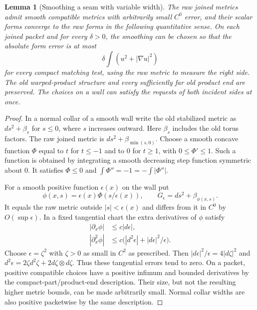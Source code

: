 \documentclass[11pt]{article}
\numberwithin{equation}{section}
\newtheorem{lemma}[theorem]{Lemma}
\theoremstyle{definition}
\theoremstyle{remark}
\begin{document}
\begin{lemma}[Smoothing a seam with variable width]\label{regular:seam}
The raw joined metrics admit smooth compatible metrics with arbitrarily
small $C^0$ error, and their scalar forms converge to the raw forms in
the following quantitative sense.  On each joined packet and for every
$\delta>0$, the smoothing can be chosen so that the absolute form
error is at most
\[
 \delta\int(u^2+|\nabla u|^2)
\]
for every compact matching test, using the raw metric to measure the
right side.  The old warped-product structure and every sufficiently
far old product end are preserved.  The choices on a wall can satisfy
the requests of both incident sides at once.
\end{lemma}

\begin{proof}
In a normal collar of a smooth wall write the old stabilized metric
as $ds^2+\beta_s$ for $s\le0$, where $s$ increases outward.  Here
$\beta_s$ includes the old torus factors.  The raw joined metric is
$ds^2+\beta_{\min(s,0)}$.  Choose a smooth concave function $\Phi$
equal to $t$ for $t\le-1$ and to $0$ for $t\ge1$, with
$0\le\Phi'\le1$.  Such a function is obtained by integrating a smooth
decreasing step function symmetric about $0$.  It satisfies
$\Phi\le0$ and $\int\Phi''=-1= -\int|\Phi''|$.

For a smooth positive function $\epsilon(x)$ on the wall put
\[
 \phi(x,s)=\epsilon(x)\Phi(s/\epsilon(x)),\qquad
 G_\epsilon=ds^2+\beta_{\phi(x,s)}.
\]
It equals the raw metric outside $|s|<\epsilon(x)$ and differs from it
in $C^0$ by $O(\sup\epsilon)$.  In a fixed tangential chart the extra
derivatives of $\phi$ satisfy
\begin{align*}
 |\partial_x\phi|&\le c|d\epsilon|,\\
 |\partial_x^2\phi|&\le
 c\bigl(|d^2\epsilon|+|d\epsilon|^2/\epsilon\bigr).
\end{align*}
Choose $\epsilon=\zeta^2$ with $\zeta>0$ as small in $C^2$ as
prescribed.  Then $|d\epsilon|^2/\epsilon=4|d\zeta|^2$ and
$d^2\epsilon=2\zeta d^2\zeta+2d\zeta\otimes d\zeta$.
Thus these tangential errors tend to zero.  On a packet, positive
compatible choices have a positive infimum and bounded derivatives by
the compact-part/product-end description.  Their size, but not the
resulting higher metric bounds, can be made arbitrarily small.  Normal
collar widths are also positive packetwise by the same description.


\end{proof}
\end{document}

